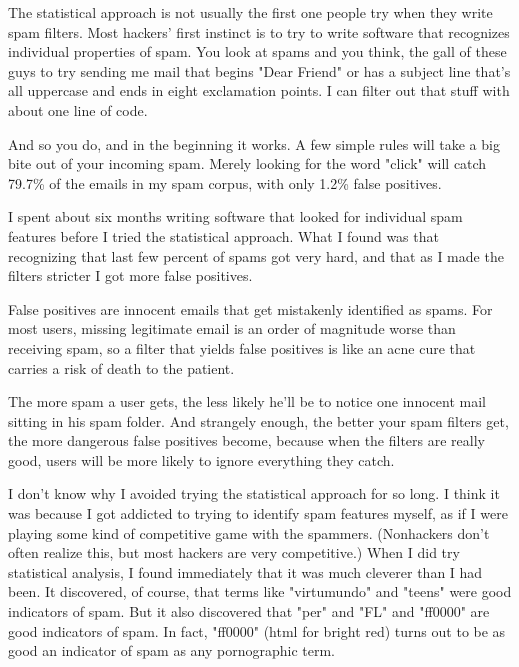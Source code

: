 The statistical approach
                    is not usually the first one people try when they write spam
                    filters. Most hackers' first instinct is to try to write
                    software that recognizes individual properties of spam. You
                    look at spams and you think, the gall of these guys to try
                    sending me mail that begins "Dear Friend" or has a subject
                    line that's all uppercase and ends in eight exclamation
                    points. I can filter out that stuff with about one line of
                    code.

And so you do, and in the beginning it
                    works. A few simple rules will take a big bite out of your
                    incoming spam. Merely looking for the word "click" will
                    catch 79.7\% of the emails in my spam corpus, with only 1.2\%
                    false positives.

I spent about six months writing
                    software that looked for individual spam features before I
                    tried the statistical approach. What I found was that
                    recognizing that last few percent of spams got very hard,
                    and that as I made the filters stricter I got more false
                    positives.

False positives are innocent emails
                    that get mistakenly identified as spams. For most users,
                    missing legitimate email is an order of magnitude worse than
                    receiving spam, so a filter that yields false positives is
                    like an acne cure that carries a risk of death to the
                    patient.

The more spam a user gets, the less
                    likely he'll be to notice one innocent mail sitting in his
                    spam folder. And strangely enough, the better your spam
                    filters get, the more dangerous false positives become,
                    because when the filters are really good, users will be more
                    likely to ignore everything they catch.

I don't
                    know why I avoided trying the statistical approach for so
                    long. I think it was because I got addicted to trying to
                    identify spam features myself, as if I were playing some
                    kind of competitive game with the spammers. (Nonhackers
                    don't often realize this, but most hackers are very
                    competitive.) When I did try statistical analysis, I found
                    immediately that it was much cleverer than I had been. It
                    discovered, of course, that terms like "virtumundo" and
                    "teens" were good indicators of spam. But it also discovered
                    that "per" and "FL" and "ff0000" are good indicators of
                    spam. In fact, "ff0000" (html for bright red) turns out to
                    be as good an indicator of spam as any pornographic term.


